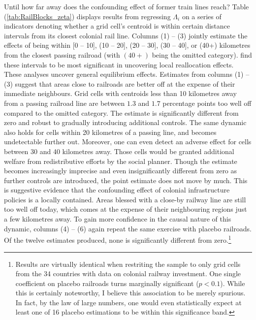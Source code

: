 \documentclass[11pt, oneside]{article}   	%
\let\oldref\ref
\renewcommand{\ref}[1]{(\oldref{#1})}
\begin{document}
Until how far away does the confounding effect of former train lines reach? Table \ref{tab:RailBlocks_zeta} displays results from regressing $\Lambda_{i}$ on a series of indicators denoting whether a grid cell's centroid is within certain distance intervals from its closest colonial rail line. Columns (1) -- (3) jointly estimate the effects of being within [0 -- 10], (10 -- 20], (20 -- 30], (30 -- 40], or (40+) kilometres from the closest passing railroad (with $(40+)$ being the omitted category). \cite{Jedwab_PermanentEffectsTransportation_2016a} find these intervals to be most significant in uncovering local reallocation effects. These analyses uncover general equilibrium effects. Estimates from columns (1) -- (3) suggest that areas close to railroads are better off at the expense of their immediate neighbours. Grid cells with centroids less than 10 kilometres away from a passing railroad line are between $1.3$ and $1.7$ percentage points too well off compared to the omitted category. The estimate is significantly different from zero and robust to gradually introducing additional controls. The same dynamic also holds for cells within 20 kilometres of a passing line, and becomes undetectable further out. Moreover, one can even detect an adverse effect for cells between 30 and 40 kilometres away. Those cells would be granted additional welfare from redistributive efforts by the social planner. Though the estimate becomes increasingly imprecise and even insignificantly different from zero as further controls are introduced, the point estimate does not move by much. This is suggestive evidence that the confounding effect of colonial infrastructure policies is a locally contained. Areas blessed with a close-by railway line are still too well off today, which comes at the expense of their neighbouring regions just a few kilometres away. To gain more confidence in the causal nature of this dynamic, columns (4) -- (6) again repeat the same exercise with placebo railroads. Of the twelve estimates produced, none is significantly different from zero.\footnote{Results are virtually identical when restriting the sample to only grid cells from the 34 countries with data on colonial railway investment. One single coefficient on placebo railroads turns marginally significant ($p<0.1$). While this is certainly noteworthy, I believe this association to be merely spurious. In fact, by the law of large numbers, one would even statistically expect at least one of 16 placebo estimations to be within this significance band.}
\end{document}
